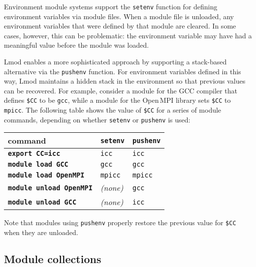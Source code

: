 Environment module systems support the \texttt{\small setenv} function for 
defining environment variables via module files. When a module file is unloaded,
any environment variables that were defined by that module are cleared. In some
cases, however, this can be problematic: the environment variable may have had a
meaningful value before the module was loaded.

Lmod enables a more sophisticated approach by supporting a stack-based
alternative via the \texttt{\small pushenv} function. For environment
variables defined in this way, Lmod maintains a hidden stack in the environment
so that previous values can be recovered.
For example, consider a module for the GCC compiler that
defines \texttt{\small \$CC} to be \texttt{\small gcc}, while a module for the
Open\,MPI library sets \texttt{\small \$CC} to
\texttt{\small mpicc}. The following table shows the value of \texttt{\small \$CC}
for a series of module commands, depending on whether \texttt{\small setenv} or
\texttt{\small pushenv} is used:
\begin{center}
 \begin{tabular}{l|l|l}
 command                                 & \texttt{\small setenv} & \texttt{\small pushenv}\\
 \hline
 \textbf{\texttt{\small export CC=icc}}  & \texttt{\small icc}  & \texttt{\small icc} \\
 \textbf{\texttt{\small module load   GCC}}   & \texttt{\small gcc}    & \texttt{\small gcc}  \\
 \textbf{\texttt{\small module load   OpenMPI}} & \texttt{\small mpicc}  & \texttt{\small mpicc} \\
 \textbf{\texttt{\small module unload OpenMPI}} & \emph{(none)}   & \texttt{\small gcc}  \\
 \textbf{\texttt{\small module unload GCC}}   & \emph{(none)}   & \texttt{\small icc} \\
  \hline
    \end{tabular}
\end{center}
\noindent
Note that modules using \texttt{\small pushenv} properly restore the previous value
for \texttt{\small\$CC} when they are unloaded.


\subsection{Module collections}

